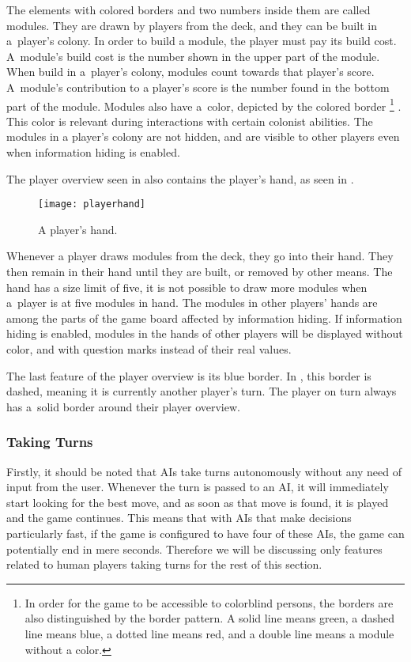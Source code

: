 The elements with colored borders and two numbers inside them are called modules.
They are drawn by players from the deck, and they can be built in a~player's colony.
In order to build a module, the player must pay its build cost. A~module's build cost
is the number shown in the upper part of the module. When build in a~player's colony,
modules count towards that player's score. A~module's contribution to a player's
score is the number found in the bottom part of the module. Modules also have
a~color, depicted by the colored border \footnote{In order for the game to be accessible
to colorblind persons, the borders are also distinguished by the border pattern. A solid
line means green, a dashed line means blue, a dotted line means red, and a double line means
a module without a color.}
. This color is relevant during interactions
with certain colonist abilities. The modules in a player's colony are not hidden, and
are visible to other players even when information hiding is enabled.

The player overview seen in  also contains the player's hand, as seen
in .

\begin{figure}[ht]
\centerline{\mbox{\texttt{[image: playerhand]}}}
\caption{A player's hand.}\label{ud:hand}
\end{figure}

Whenever a player draws modules from the deck, they go into their hand. They then remain in
their hand until they are built, or removed by other means. The hand has a size limit of
five, it is not possible to draw more modules when a~player is at five modules in hand.
The modules in other players' hands are among the parts of the game board affected
by information hiding. If information hiding is enabled, modules in the hands of other
players will be displayed without color, and with question marks instead of
their real values.

The last feature of the player overview is its blue border. In ,
this border is dashed, meaning it is currently another player's turn. The player on
turn always has a~solid border around their player overview.

\subsubsection{Taking Turns}

Firstly, it should be noted that AIs take turns autonomously without any need of input
from the user. Whenever the turn is passed to an AI, it will immediately start
looking for the best move, and as soon as that move is found, it is played and the game
continues. This means that with AIs that make decisions particularly fast, if the game
is configured to have four of these AIs, the game can potentially end in mere seconds.
Therefore we will be discussing only features related to human players taking turns
for the rest of this section.

